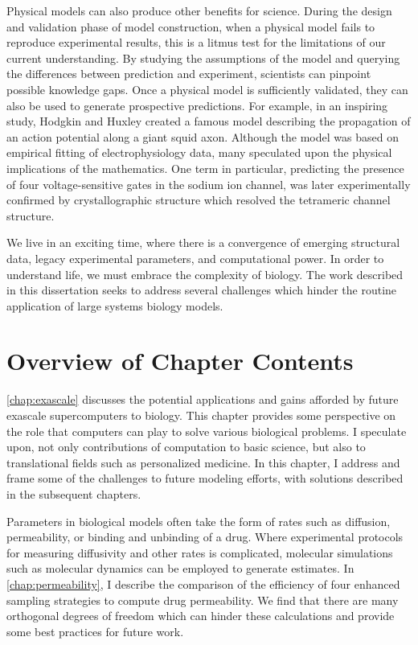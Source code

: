 \par Physical models can also produce other benefits for science.
During the design and validation phase of model construction, when a physical model fails to reproduce experimental results, this is a litmus test for the limitations of our current understanding.
By studying the assumptions of the model and querying the differences between prediction and experiment, scientists can pinpoint possible knowledge gaps.
Once a physical model is sufficiently validated, they can also be used to generate prospective predictions.
For example, in an inspiring study, Hodgkin and Huxley created a famous model describing the propagation of an action potential along a giant squid axon\cite{HUXLEY1952}.
Although the model was based on empirical fitting of electrophysiology data, many speculated upon the physical implications of the mathematics.
One term in particular, predicting the presence of four voltage-sensitive gates in the sodium ion channel, was later experimentally confirmed by crystallographic structure which resolved the tetrameric channel structure\cite{Sigg2014a}.

\par We live in an exciting time, where there is a convergence of emerging structural data, legacy experimental parameters, and computational power.
In order to understand life, we must embrace the complexity of biology.
The work described in this dissertation seeks to address several challenges which hinder the routine application of large systems biology models.

\section{Overview of Chapter Contents}

\par \cref{chap:exascale} discusses the potential applications and gains afforded by future exascale supercomputers to biology.
This chapter provides some perspective on the role that computers can play to solve various biological problems.
I speculate upon, not only contributions of computation to basic science, but also to translational fields such as personalized medicine.
In this chapter, I address and frame some of the challenges to future modeling efforts, with solutions described in the subsequent chapters.

\par Parameters in biological models often take the form of rates such as diffusion, permeability, or binding and unbinding of a drug.
Where experimental protocols for measuring diffusivity and other rates is complicated, molecular simulations such as molecular dynamics can be employed to generate estimates.
In \cref{chap:permeability}, I describe the comparison of the efficiency of four enhanced sampling strategies to compute drug permeability.
We find that there are many orthogonal degrees of freedom which can hinder these calculations and provide some best practices for future work.

